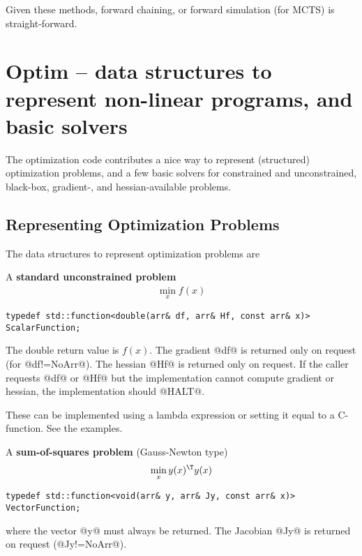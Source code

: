 \documentclass[10pt,fleqn,twoside]{article}
\begin{document}
{{Given these methods, forward chaining, or forward simulation (for
MCTS) is straight-forward. 


\section{Optim -- data structures to represent non-linear programs, and
  basic solvers}

The optimization code contributes a nice way to represent (structured)
optimization problems, and a few basic solvers for constrained and
unconstrained, black-box, gradient-, and hessian-available problems.

\subsection{Representing Optimization Problems}

The data structures to represent optimization problems are

A \textbf{standard unconstrained problem}
\begin{align}
\min_x f(x)
\end{align}
\begin{shaded}
\begin{Verbatim}
typedef std::function<double(arr& df, arr& Hf, const arr& x)> ScalarFunction;
\end{Verbatim}
\end{shaded}
The double return value is $f(x)$. The gradient @df@ is returned only
on request (for @df!=NoArr@). The hessian @Hf@ is returned only on
request. If the caller requests @df@ or @Hf@ but the implementation
cannot compute gradient or hessian, the implementation should @HALT@.

These can be implemented using a lambda expression or setting it equal
to a C-function. See the examples. 

A \textbf{sum-of-squares problem} (Gauss-Newton type)
\begin{align}
\min_x y(x)^\T y(x)
\end{align}
\begin{shaded}
\begin{Verbatim}
typedef std::function<void(arr& y, arr& Jy, const arr& x)> VectorFunction;
\end{Verbatim}
\end{shaded}
where the vector @y@ must always be returned. The Jacobian @Jy@ is
returned on request (@Jy!=NoArr@).

}}
\end{document}

